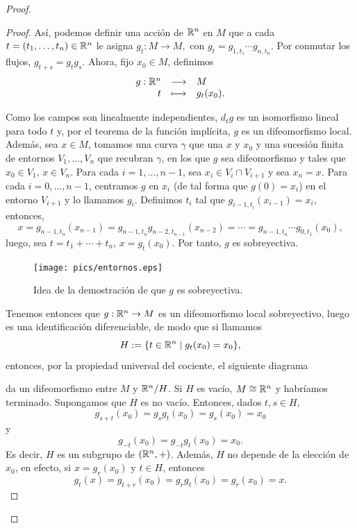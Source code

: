 \begin{proof}
\begin{proof}
  Así, podemos definir una acción de $\mathbb{R}^n$ en $M$ que a cada $t=(t_1,\dots,t_n)\in \mathbb{R}^n$ le asigna $g_t:M\rightarrow M,$ con $g_t=g_{1,t_1}\cdots g_{n,t_n}$.
Por conmutar los flujos, $g_{t+s}=g_t g_s$. Ahora, fijo $x_0 \in M$, definimos 
\[
  \begin{array}{rcl}
g:\mathbb{R}^n & \longrightarrow & M \\
t & \longmapsto & g_t (x_0).
\end{array}
\]

Como los campos son linealmente independientes, $d_t g$ es un isomorfismo lineal para todo $t$ y, por el teorema de la función implícita, $g$ es un difeomorfismo local. Además, sea $x\in M$, tomamos una curva $\gamma$ que una $x$ y $x_0$ y una sucesión finita de entornos $V_1,\dots,V_n$ que recubran $\gamma$, en los que $g$ sea difeomorfismo y tales que $x_0 \in V_1$, $x \in V_n$. Para cada $i=1,\dots,n-1$, sea $x_i \in V_i \cap V_{i+1}$ y sea $x_n=x$. Para cada $i=0,\dots,n-1$, centramos $g$ en $x_i$ (de tal forma que $g(0)=x_i$) en el entorno $V_{i+1}$ y lo llamamos $g_i$. Definimos $t_i$ tal que $g_{i-1,t_i}(x_{i-1})=x_i$, entonces,
\[
  x=g_{n-1,t_n}(x_{n-1})=g_{n-1,t_n}g_{n-2,t_{n-1}}(x_{n-2})=\cdots=g_{n-1,t_{n}}\cdots g_{0,t_1} (x_0),
\]
luego, sea $t=t_1+\cdots+t_n$, $x=g_t (x_0)$. Por tanto, $g$ es sobreyectiva.
\begin{figure}[h]
  \centering
  \texttt{[image: pics/entornos.eps]}
  \caption{\small Idea de la demostración de que $g$ es sobreyectiva.}
  \label{fig:entornos}
\end{figure}

Tenemos entonces que $g:\mathbb{R}^n\rightarrow M$ es un difeomorfismo local sobreyectivo, luego es una identificación diferenciable, de modo que si llamamos 
\[  
  H:=\{t \in \mathbb{R}^n \mid g_t(x_0)=x_0\},
\]
entonces, por la propiedad universal del cociente, el siguiente diagrama
\begin{center}
\end{center}
da un difeomorfismo entre $M$ y $\mathbb{R}^n/H$. Si $H$ es vacío, $M\cong \mathbb{R}^n$ y habríamos terminado. Supongamos que $H$ es no vacío.
 Entonces, dados $t, s \in H$, 
\[
  g_{s+t}(x_0)=g_sg_t(x_0)=g_s(x_0)=x_0
\]
y 
\[
  g_{-t}(x_0)=g_{-t}g_t(x_0)=x_0.
\] 
Es decir, $H$ es un subgrupo de $(\mathbb{R}^n,+)$. Además, $H$ no depende de la elección de $x_0$, en efecto, si $x=g_r (x_0)$ y $t\in H$, entonces 
\[
  g_t (x) = g_{t+r}(x_0)=g_rg_t(x_0)=g_r(x_0)=x. 
 \] 


\end{proof}
\end{proof}
